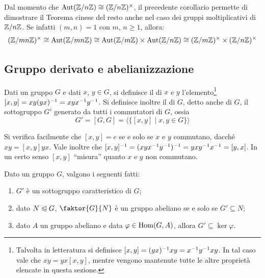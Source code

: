 \documentclass[11pt]{scrartcl}
\begin{document}
	\begin{remark}
		Dal momento che $\operatorname{Aut}({\mathbb Z}/n{\mathbb Z}) \cong ({\mathbb Z}/n{\mathbb Z})^\times$, il precedente
		corollario permette di dimostrare il Teorema cinese del resto anche
		nel caso dei gruppi moltiplicativi di ${\mathbb Z}/n{\mathbb Z}$. Se infatti $(m, n) = 1$
		con $m$, $n \geq 1$, allora:
		\[ (\mathbb{Z}/{mn}\mathbb{Z})^\times \cong \operatorname{Aut}(\mathbb{Z}/{mn}\mathbb{Z}) \cong \operatorname{Aut}({\mathbb Z}/m{\mathbb Z}) \times \operatorname{Aut}({\mathbb Z}/n{\mathbb Z}) \cong ({\mathbb Z}/m{\mathbb Z})^\times \times ({\mathbb Z}/n{\mathbb Z})^\times \]
	\end{remark}
	
	\newpage
	
	\subsection{Gruppo derivato e abelianizzazione}
	
	\begin{definition}
		Dati un gruppo $G$ e dati $x$, $y \in G$, si definisce il 
		di $x$ e $y$ l'elemento\footnote{
			Talvolta in letteratura si definisce $[x, y] = (yx)^{-1} xy = x^{-1} y^{-1} x y$. In
			tal caso vale che $xy = yx[x, y]$, mentre vengono mantenute tutte le
			altre proprietà elencate in questa sezione.
		} $[x, y] = xy(yx)^{-1} = xyx^{-1}y^{-1}$. Si definisce inoltre
		il  di $G$, detto anche  di $G$,
		il sottogruppo $G'$ generato da tutti i commutatori di $G$, ossia
		\[
		G' = [G, G] = \langle\{[x, y]\mid x, y \in G\}\rangle
		\]
	\end{definition}
	
	\begin{remark}
		Si verifica facilmente che $[x, y] = e$ se e solo se $x$ e $y$ commutano, dacché
		$xy = [x, y]yx$. Vale inoltre che $[x, y]^{-1} = (xyx^{-1} y^{-1})^{-1} = yxy^{-1} x^{-1} =
		[y, x]$. In un certo senso $[x, y]$ ``misura'' quanto $x$ e $y$ non commutano.
	\end{remark}
	
	\begin{proposition}
		\label{prop1.35}
		Dato un gruppo $G$, valgono i seguenti fatti:
		\begin{enumerate}[(1)]
			\item $G'$ è un sottogruppo caratteristico di $G$;
			\item dato $N \trianglelefteqslant G$, $\faktor{G}{N}$ è un gruppo abeliano se
			e solo se $G' \subseteq N$;
			\item dato $A$ un gruppo abeliano e data $\varphi \in \operatorname{Hom}(G, A)$,
			allora $G' \subseteq \ker\varphi$.
		\end{enumerate}
	\end{proposition}
	
\end{document}
